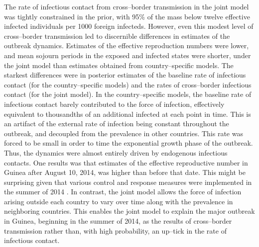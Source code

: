 The rate of infectious contact from cross--border transmission in the joint model was tightly constrained in the prior, with 95\% of the mass below twelve effective infected individuals per 1000 foreign infecteds. However, even this modest level of cross--border transmission led to discernible differences in estimates of the outbreak dynamics. Estimates of the effective reproduction numbers were lower, and mean sojourn periods in the exposed and infected states were shorter, under the joint model than estimates obtained from country--specific models. The starkest differences were in posterior estimates of the baseline rate of infectious contact (for the country--specific models) and the rates of cross--border infectious contact (for the joint model). In the country--specific models, the baseline rate of infectious contact barely contributed to the force of infection, effectively equivalent to thousandths of an additional infected at each point in time. This is an artifact of the external rate of infection being constant throughout the outbreak, and decoupled from the prevalence in other countries. This rate was forced to be small in order to time the exponential growth phase of the outbreak. Thus, the dynamics were almost entirely driven by endogenous infectious contacts. One results was that estimates of the effective reproductive number in Guinea after August 10, 2014, was higher than before that date. This might be surprising given that various control and response measures were implemented in the summer of 2014 \cite{coltart2017ebola}. In contrast, the joint model allows the force of infection arising outside each country to vary over time along with the prevalence in neighboring countries. This enables the joint model to explain the major outbreak in Guinea, beginning in the summer of 2014, as the results of cross--border transmission rather than, with high probability, an up--tick in the rate of infectious contact.

